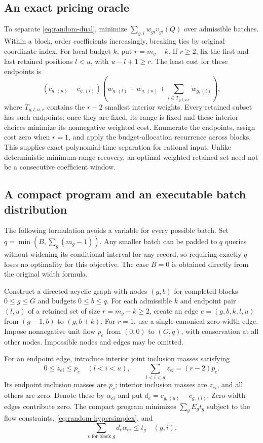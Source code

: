 \documentclass[12pt]{article}
\begin{document}
\subsection{An exact pricing oracle}
To separate \eqref{eq:random-dual}, minimize
$\sum_{g,i}w_{gi}v_{gi}(Q)$ over admissible batches. Within a block, order
coefficients increasingly, breaking ties by original coordinate index.
For local budget $k$, put $r=m_g-k$. If $r\geq2$, fix the first and last
retained positions $l<u$, with $u-l+1\geq r$. The least cost for these
endpoints is
\begin{equation}
 (c_{g,(u)}-c_{g,(l)})
 \left(w_{g,(l)}+w_{g,(u)}+
       \sum_{i\in T_{g,l,u,r}}w_{g,(i)}\right),
 \label{eq:random-pricing}
\end{equation}
where $T_{g,l,u,r}$ contains the $r-2$ smallest interior weights.
Every retained subset has such endpoints; once they are fixed, its range
is fixed and these interior choices minimize its nonnegative weighted
cost. Enumerate the endpoints, assign cost zero when $r=1$, and apply
the budget-allocation recurrence across blocks. This supplies exact
polynomial-time separation for rational input. Unlike deterministic
minimum-range recovery, an optimal weighted retained set need not be
a consecutive coefficient window.

\subsection{A compact program and an executable batch distribution}
The following formulation avoids a variable for every possible batch.
Set $q=\min(B,\sum_g(m_g-1))$. Any smaller batch can be padded to $q$
queries without widening its conditional interval for any record, so
requiring exactly $q$ loses no optimality for this objective.
The case $B=0$ is obtained directly from the original width formula.

Construct a directed acyclic graph with nodes $(g,b)$ for completed
blocks $0\leq g\leq G$ and budgets $0\leq b\leq q$. For each admissible
$k$ and endpoint pair $(l,u)$ of a retained set of size $r=m_g-k\geq2$,
create an edge $e=(g,b,k,l,u)$ from $(g-1,b)$ to $(g,b+k)$.
For $r=1$, use a single canonical zero-width edge. Impose nonnegative
unit flow $p_e$ from $(0,0)$ to $(G,q)$, with conservation at all other
nodes. Impossible nodes and edges may be omitted.

For an endpoint edge, introduce interior joint inclusion masses satisfying
\begin{equation}
 0\leq z_{ei}\leq p_e\quad(l<i<u),\qquad
 \sum_{l<i<u}z_{ei}=(r-2)p_e.
 \label{eq:random-hypersimplex}
\end{equation}
Its endpoint inclusion masses are $p_e$; interior inclusion masses are
$z_{ei}$, and all others are zero. Denote these by $\alpha_{ei}$ and
put $d_e=c_{g,(u)}-c_{g,(l)}$. Zero-width edges contribute zero.
The compact program minimizes $\sum_gE_gt_g$ subject to the flow
constraints, \eqref{eq:random-hypersimplex}, and
\begin{equation}
 \sum_{e\text{ for block }g}d_e\alpha_{ei}\leq t_g
 \quad(g,i).
 \label{eq:random-compact}
\end{equation}
\end{document}
